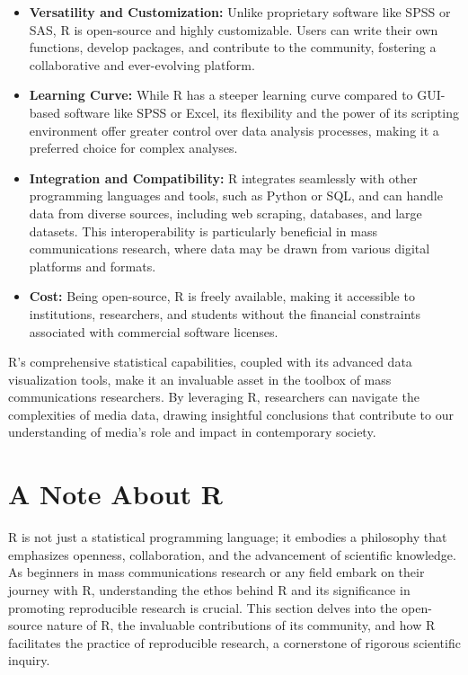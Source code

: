 \documentclass[
]{book}
\begin{document}
\begin{itemize}
\item
  \textbf{Versatility and Customization:} Unlike proprietary software like SPSS or SAS, R is open-source and highly customizable. Users can write their own functions, develop packages, and contribute to the community, fostering a collaborative and ever-evolving platform.
\item
  \textbf{Learning Curve:} While R has a steeper learning curve compared to GUI-based software like SPSS or Excel, its flexibility and the power of its scripting environment offer greater control over data analysis processes, making it a preferred choice for complex analyses.
\item
  \textbf{Integration and Compatibility:} R integrates seamlessly with other programming languages and tools, such as Python or SQL, and can handle data from diverse sources, including web scraping, databases, and large datasets. This interoperability is particularly beneficial in mass communications research, where data may be drawn from various digital platforms and formats.
\item
  \textbf{Cost:} Being open-source, R is freely available, making it accessible to institutions, researchers, and students without the financial constraints associated with commercial software licenses.
\end{itemize}

R's comprehensive statistical capabilities, coupled with its advanced data visualization tools, make it an invaluable asset in the toolbox of mass communications researchers. By leveraging R, researchers can navigate the complexities of media data, drawing insightful conclusions that contribute to our understanding of media's role and impact in contemporary society.

\section{A Note About R}\label{a-note-about-r}

R is not just a statistical programming language; it embodies a philosophy that emphasizes openness, collaboration, and the advancement of scientific knowledge. As beginners in mass communications research or any field embark on their journey with R, understanding the ethos behind R and its significance in promoting reproducible research is crucial. This section delves into the open-source nature of R, the invaluable contributions of its community, and how R facilitates the practice of reproducible research, a cornerstone of rigorous scientific inquiry.
\end{document}
